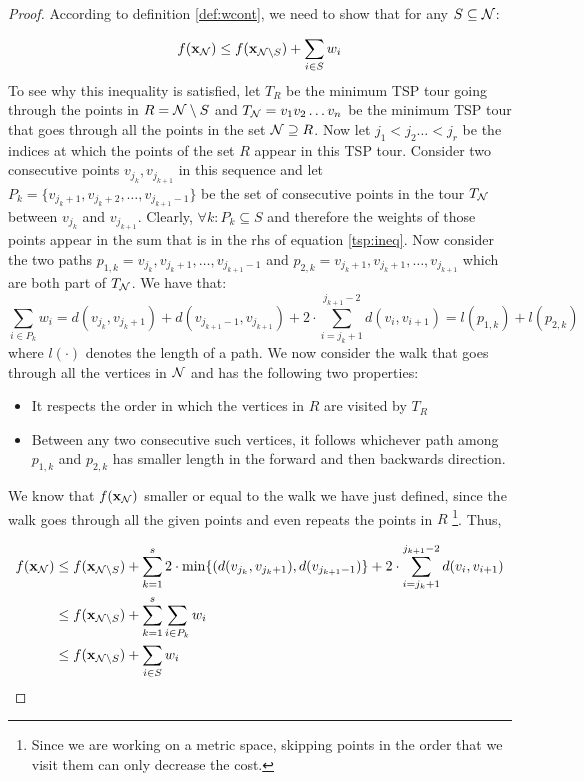 \begin{proof}
According to definition \ref{def:wcont}, we need to show that for any $S\subseteq\mathcal{N}$:

    \begin{equation}\label{tsp:ineq} f(\mathbf{x}_{\mathcal{N}}) \le f(\mathbf{x}_{\mathcal{N}\setminus S}) + \sum_{i \in S} w_i
    \end{equation}
To see why this inequality is satisfied, %
let $T_R$ be the minimum TSP tour going through the points in $R=\mathcal{N}\setminus S$ and $T_{\mathcal{N}}=v_1v_2\dots v_n$ be the minimum TSP tour that goes through all the points in the
set $\mathcal{N}\supseteq R$. Now let $j_1<j_2\dots <j_r$ be the indices at which the points of the set $R$ appear in this TSP tour.  Consider two consecutive points
$v_{j_k},v_{j_{k+1}}$ in this sequence and let $P_k=\{v_{j_k+1},v_{j_k+2},\dots, v_{j_{k+1}-1}\}$ be the set of consecutive points in the tour $T_{\mathcal{N}}$ between
$v_{j_k}$ and $v_{j_{k+1}}$. Clearly, $\forall k: P_k\subseteq  S$ and therefore the weights of those points appear in the sum that is in the rhs of
equation \eqref{tsp:ineq}. Now consider the two paths $p_{1,k}=v_{j_k},v_{j_k+1},\dots, v_{j_{k+1}-1}$ and $p_{2,k}=v_{j_k+1},v_{j_k+1},\dots, v_{j_{k+1}}$ which are
both part of $T_{\mathcal{N}}$. We have that:
\[
\sum_{i\in P_k} w_i = d(v_{j_k},v_{j_k+1})+d(v_{j_{k+1}-1},v_{j_{k+1}})+2\cdot \sum_{i=j_k+1}^{j_{k+1}-2} d(v_i,v_{i+1})=l(p_{1,k})+l(p_{2,k})
\]
where $l(\cdot)$ denotes the length of a path. %
We now consider the walk that goes through all the vertices in $\mathcal{N}$ and has the following two properties:
\begin{itemize}
  \item It respects the order in which the vertices in $R$ are visited by $T_R$
  \item Between any two consecutive such vertices, it follows whichever path among $p_{1,k}$ and $p_{2,k}$ has smaller length in the forward and then backwards
direction.
\end{itemize}

We know that $f(\mathbf{x}_{\mathcal{N}})$ smaller or equal to the walk we have just defined, since the walk goes through all the given points and even repeats the points in
$R$ \footnote{Since we are working on a metric space, skipping points in the order that we visit them can only decrease the cost.}. Thus,

\begin{align*}
 f(\mathbf{x}_{\mathcal{N}}) &\le f(\mathbf{x}_{\mathcal{N}\setminus S}) + \sum_{k=1}^s 2\cdot \min\{(d(v_{j_k},v_{j_k+1}),d(v_{j_{k+1}-1})\}+ 2\cdot \sum_{i=j_k+1}^{j_{k+1}-2} d(v_i,v_{i+1}) \\
 &\le f(\mathbf{x}_{\mathcal{N}\setminus S}) + \sum_{k=1}^s\sum_{i\in P_k}w_i\\
 &\le f(\mathbf{x}_{\mathcal{N}\setminus S}) + \sum_{i \in  S} w_i
\end{align*}
\end{proof}

